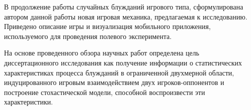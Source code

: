 В продолжение работы случайных блужданий игрового типа, сформулирована автором данной работы новая игровая механика, предлагаемая к исследованию. 
Приведено описание игры и визуализация мобильного приложения, используемого для проведения полевого эксперимента.

На основе проведенного обзора научных работ определена цель диссертационного исследования как
получение информации о статистических характеристиках процесса блужданий в ограниченной двухмерной области, индуцированного игровым
взаимодействием двух игроков-оппонентов и построение стохастической модели, способной воспроизвести эти характеристики.









